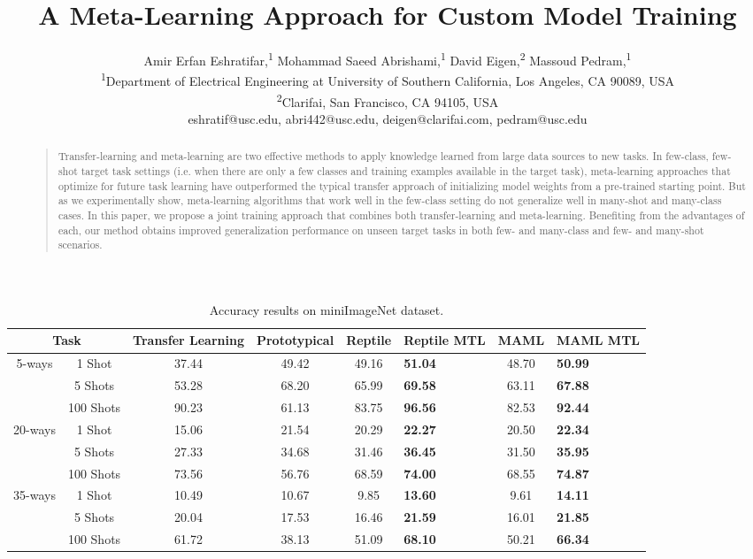 \documentclass[letterpaper]{article}
\title{A Meta-Learning Approach for Custom Model Training}
\author{Amir Erfan Eshratifar,\textsuperscript{1}
         Mohammad Saeed Abrishami,\textsuperscript{1}
         David Eigen,\textsuperscript{2}
         Massoud Pedram,\textsuperscript{1}\\
\textsuperscript{1}{Department of Electrical Engineering at University of Southern California, Los Angeles, CA 90089, USA}\\
\textsuperscript{2}{Clarifai, San Francisco, CA 94105, USA}\\
eshratif@usc.edu,
abri442@usc.edu,
deigen@clarifai.com,
pedram@usc.edu}
\begin{document}
\maketitle
\begin{abstract}
\begin{quote}

Transfer-learning and meta-learning are two effective methods to apply knowledge learned from large data sources to new tasks. In few-class, few-shot target task settings (i.e. when there are only a few classes and training examples available in the target task), meta-learning approaches that optimize for future task learning have outperformed the typical transfer approach of initializing model weights from a pre-trained starting point. But as we experimentally show, meta-learning algorithms that work well in the few-class setting do not generalize well in many-shot and many-class cases. In this paper, we propose a joint training approach that combines both transfer-learning and meta-learning. Benefiting from the advantages of each, our method obtains improved generalization performance on unseen target tasks in both few- and many-class and few- and many-shot scenarios.


\end{quote}
\end{abstract}
\begin{table}[ht]
\caption{Accuracy results on miniImageNet dataset.}
  \centering
\label{tab:miniimagenet_results}
\begin{tabular}{c|c|c|c|c|b|c|b}
\multicolumn{2}{c|}{Task}   & Transfer Learning & Prototypical & Reptile & Reptile MTL & MAML & MAML MTL\\
\hline
\multirow{3}{*}{5-ways}  & 1 Shot   &   37.44    & 49.42   & 49.16    & \textbf{51.04}  &   48.70    &  \textbf{50.99}\\
                         & 5 Shots  &   53.28    & 68.20   & 65.99    & \textbf{69.58}  &   63.11   &   \textbf{67.88}\\
                         & 100 Shots &   90.23    & 61.13   & 83.75    & \textbf{96.56}  &   82.53    & \textbf{92.44}\\
\hline
\multirow{3}{*}{20-ways} & 1 Shot   &   15.06    & 21.54   & 20.29    & \textbf{22.27}  &   20.50    & \textbf{22.34}\\
                         & 5 Shots  &   27.33    & 34.68   & 31.46    & \textbf{36.45}  &   31.50    & \textbf{35.95}\\
                         & 100 Shots &   73.56    & 56.76   & 68.59    & \textbf{74.00}  &   68.55    & \textbf{74.87}\\
\hline
\multirow{3}{*}{35-ways} & 1 Shot   &   10.49    & 10.67   & 9.85    & \textbf{13.60}  &   9.61    & \textbf{14.11}\\
                         & 5 Shots  &   20.04    & 17.53   & 16.46    & \textbf{21.59}  &   16.01    & \textbf{21.85} \\
                         & 100 Shots &   61.72    & 38.13   & 51.09    & \textbf{68.10}  &   50.21    & \textbf{66.34}
\end{tabular}
\end{table}
\end{document}

